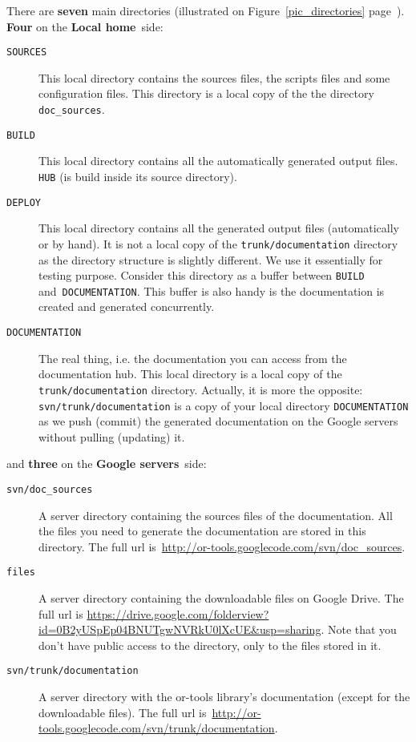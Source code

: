 \documentclass[a4paper,10pt]{article}
\newcommand{\code}[1]{\texttt{#1}}
\newcommand{\gservers}{{\bf Google servers}}
\newcommand{\lhome}{{\bf Local home}}
\begin{document}
There are {\bf seven} main directories (illustrated on Figure~\ref{pic_directories} page~\pageref{pic_directories}).\\

{\bf Four} on the \lhome\ side:

\begin{description}
 \item[\code{SOURCES}] This local directory contains the sources files, the scripts files and some configuration files. This directory is a local copy of the the directory \code{doc\_sources}.
 \item[\code{BUILD}] This local directory contains all the automatically generated output files.\\
\hspace{2cm}{\bf Exceptions:} \code{HUB} (is build inside its source directory).
 \item[\code{DEPLOY}]  This local directory contains all the generated output files (automatically or by hand). It is not a local copy of the \code{trunk/documentation} directory as the directory structure is slightly different. We use it essentially for testing purpose. Consider this directory as a buffer between \code{BUILD} and~\code{DOCUMENTATION}. This buffer is 
also handy is the documentation is created and generated concurrently.
 \item[\code{DOCUMENTATION}] The real thing, i.e. the documentation you can access from the documentation hub. This local directory is a local copy of the \code{trunk/documentation} directory. Actually, it is more the opposite: \code{svn/trunk/documentation} is a copy of your local directory \code{DOCUMENTATION} as we push (commit) the generated documentation on the Google servers without pulling (updating) it.
\end{description}

and {\bf three} on the \gservers\ side:

\begin{description}
 \item[\code{svn/doc\_sources}] A server directory containing the sources files of the documentation. All the files you need to generate the documentation are stored in this directory. The full url is~\href{http://or-tools.googlecode.com/svn/doc\_sources}{http://or-tools.googlecode.com/svn/doc\_sources}.
 \item[\code{files}] A server directory containing the downloadable files on Google Drive. The full url is \href{https://drive.google.com/folderview?id=0B2yUSpEp04BNUTgwNVRkU0lXcUE&usp=sharing}{https://drive.google.com/folderview?id=0B2yUSpEp04BNUTgwNVRkU0lXcUE\&usp=sharing}. Note that you don't have public access to the directory, only to the files stored in it.
 \item[\code{svn/trunk/documentation}] A server directory with the or-tools library's documentation (except for the downloadable files). The full url is~\href{http://or-tools.googlecode.com/svn/trunk/documentation}{http://or-tools.googlecode.com/svn/trunk/documentation}.
\end{description}
\end{document}
